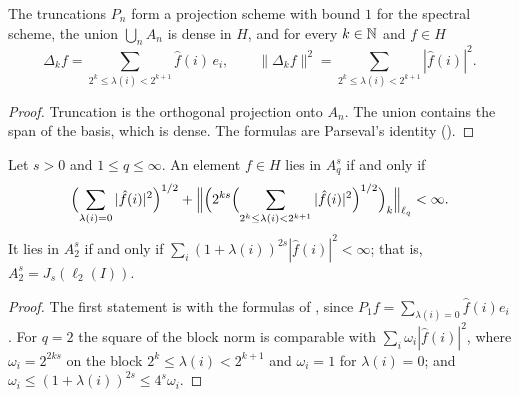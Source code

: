 \begin{proposition}
\label{prop:spectral-projections}
\leanok
{}
The truncations $P_n$ form a projection scheme with bound $1$ for the spectral scheme, the
union $\bigcup_n A_n$ is dense in $H$, and for every $k \in \mathbb{N}$ and $f \in H$
\[
  \Delta_k f = \sum_{2^k \leq \lambda(i) < 2^{k+1}} \hat f(i) \, e_i ,
  \qquad
  \|\Delta_k f\|^2 = \sum_{2^k \leq \lambda(i) < 2^{k+1}} |\hat f(i)|^2 .
\]
\end{proposition}

\begin{proof}
\leanok
{}
Truncation is the orthogonal projection onto $A_n$. The union contains the span of the
basis, which is dense. The formulas are Parseval's identity ().
\end{proof}

\begin{theorem}
\label{thm:spectral-coefficients}
\leanok
{}
Let $s > 0$ and $1 \leq q \leq \infty$. An element $f \in H$ lies in $A^s_q$ if and only if
\[
  \Bigl(\sum_{\lambda(i) = 0} |\hat f(i)|^2\Bigr)^{1/2} + \Bigl\| \Bigl(2^{ks}
    \Bigl(\sum_{2^k \leq \lambda(i) < 2^{k+1}} |\hat f(i)|^2\Bigr)^{1/2}\Bigr)_k
    \Bigr\|_{\ell_q} < \infty .
\]
It lies in $A^s_2$ if and only if $\sum_i (1 + \lambda(i))^{2s} |\hat f(i)|^2 < \infty$; that
is, $A^s_2 = J_s(\ell_2(I))$.
\end{theorem}

\begin{proof}
\leanok
The first statement is  with the formulas of
, since $P_1 f = \sum_{\lambda(i) = 0} \hat f(i) e_i$. For
$q = 2$ the square of the block norm is comparable with $\sum_i \omega_i |\hat f(i)|^2$,
where $\omega_i = 2^{2ks}$ on the block $2^k \leq \lambda(i) < 2^{k+1}$ and $\omega_i = 1$
for $\lambda(i) = 0$; and $\omega_i \leq (1 + \lambda(i))^{2s} \leq 4^s \omega_i$.
\end{proof}


